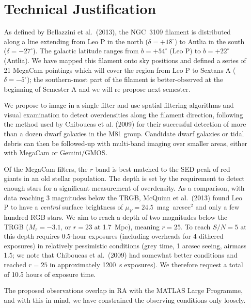 \documentclass[12pt]{article}
\begin{document}
\clearpage

\thispagestyle{empty}

\section*{Technical Justification}

As defined by Bellazzini et al.\ (2013), the NGC~3109 filament is  distributed along a line extending from Leo P in the north ($\delta = +18^{\circ}$) to
Antlia in the south ($\delta = -27^{\circ}$). The galactic latitude ranges from $b = +54^{\circ}$ (Leo P) to $b = +22^{\circ}$ (Antlia).
We have mapped this filament onto sky positions and defined a series of 21 MegaCam
pointings which will cover the region from Leo P to Sextans A  ($\delta = -5^{\circ}$); 
the southern-most part of the filament is better-observed at the beginning of Semester A and we will re-propose next semester.

We propose to image in a single filter  and use spatial filtering algorithms and visual examination to detect overdensities along the filament direction,
following the method used by Chiboucas et al. (2009) for their successful detection of more than a dozen dwarf galaxies in the M81 group.
Candidate dwarf galaxies or tidal debris can then be followed-up with multi-band imaging over smaller areas, either with MegaCam or Gemini/GMOS.

Of the MegaCam filters, the $r$ band is best-matched to the SED peak of red giants in an old stellar population.
The depth is set by the requirement to detect enough stars for a significant measurement of overdensity. As a comparison,
with data reaching 3 magnitudes below the TRGB, McQuinn et al.\ (2013) found Leo P to have a {\em central} surface brightness of $\mu_V=24.5$~mag~arcsec$^2$ and only a few hundred RGB stars. We aim to reach 
a depth of two magnitudes below the TRGB ($M_r = -3.1$, or  $r=23$ at 1.7~Mpc), meaning $r=25$.  
To reach $S/N=5$ at this depth requires 0.5-hour exposures (including overheads for 4 dithered exposures) 
in relatively pessimistic conditions (grey time, 1 arcsec seeing, airmass 1.5; we note that Chiboucas et al.\ (2009) had somewhat
better conditions and reached $r=25$ in approximately 1200~s exposures).
We therefore request a total of 10.5 hours of exposure time.


The proposed observations  overlap in RA with the MATLAS Large Programme, and with this in mind, we have constrained the observing
conditions only loosely.
\end{document}
